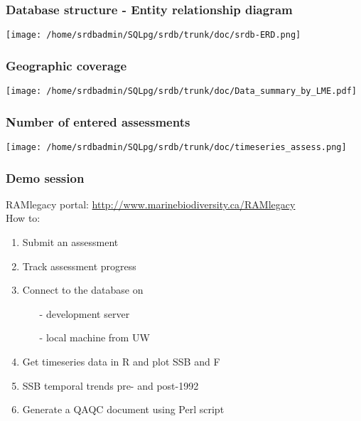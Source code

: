\documentclass{beamer}
\begin{document}
\begin{frame}[plain]
\frametitle{Database structure - Entity relationship diagram}
\hspace*{-.6cm} \texttt{[image: /home/srdbadmin/SQLpg/srdb/trunk/doc/srdb-ERD.png]}
\end{frame}


\begin{frame}[plain]
\frametitle{Geographic coverage}
\begin{center}
\texttt{[image: /home/srdbadmin/SQLpg/srdb/trunk/doc/Data\_summary\_by\_LME.pdf]}
\end{center}
\end{frame}

\begin{frame}[plain]
\frametitle{Number of entered assessments}
\begin{center}
\texttt{[image: /home/srdbadmin/SQLpg/srdb/trunk/doc/timeseries\_assess.png]}
\end{center}
\end{frame}

\begin{frame}
\frametitle{Demo session}
RAMlegacy portal: \url{http://www.marinebiodiversity.ca/RAMlegacy}\\
\vspace{.5cm}
How to:
\begin{enumerate}
\item Submit an assessment
\item Track assessment progress
\item Connect to the database on
\begin{itemize}
\item[-] development server
\item[-] local machine from UW
\end{itemize}
\item Get timeseries data in R and plot SSB and F
\item SSB temporal trends pre- and post-1992
\item Generate a QAQC document using Perl script
\end{enumerate}
\end{frame}
\end{document}

